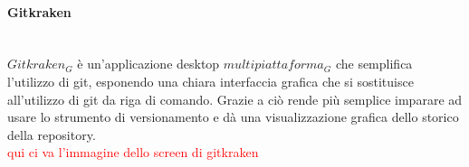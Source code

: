 		\paragraph{Gitkraken} \mbox{} \\
		$Gitkraken_G$ è un'applicazione desktop $multipiattaforma_G$ che semplifica l'utilizzo di git, esponendo una chiara interfaccia grafica che si sostituisce all'utilizzo di git da riga di comando. Grazie a ciò rende più semplice imparare ad usare lo strumento di versionamento e dà una visualizzazione grafica dello storico della repository.
		\\ \textcolor{red}{qui ci va l'immagine dello screen di gitkraken}
